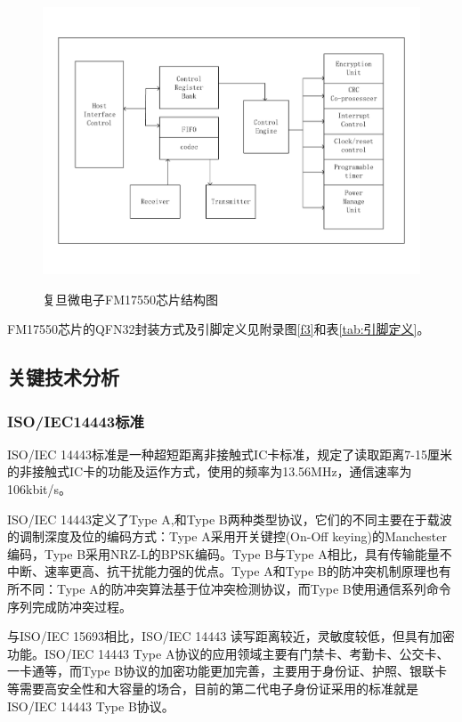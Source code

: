 \documentclass[a4paper]{ctexart}
\begin{document}
\begin{spacing}{1.5}
\begin{figure}
	\includegraphics[width=\textwidth]{figure/RFID2-2.pdf}\\
	\caption{复旦微电子FM17550芯片结构图}\label{f2}
\end{figure}

FM17550芯片的QFN32封装方式及引脚定义见附录图\ref{f3}和表\ref{tab:引脚定义}。
\subsection{关键技术分析}
\subsubsection{ISO/IEC14443标准}
ISO/IEC 14443标准是一种超短距离非接触式IC卡标准，规定了读取距离7-15厘米的非接触式IC卡的功能及运作方式，使用的频率为13.56MHz，通信速率为106kbit/s。

ISO/IEC 14443定义了Type A,和Type B两种类型协议，它们的不同主要在于载波的调制深度及位的编码方式：Type A采用开关键控(On-Off keying)的Manchester编码，Type B采用NRZ-L的BPSK编码。Type B与Type A相比，具有传输能量不中断、速率更高、抗干扰能力强的优点。Type A和Type B的防冲突机制原理也有所不同：Type A的防冲突算法基于位冲突检测协议，而Type B使用通信系列命令序列完成防冲突过程。

与ISO/IEC 15693相比，ISO/IEC 14443 读写距离较近，灵敏度较低，但具有加密功能。ISO/IEC 14443 Type A协议的应用领域主要有门禁卡、考勤卡、公交卡、一卡通等，而Type B协议的加密功能更加完善，主要用于身份证、护照、银联卡等需要高安全性和大容量的场合，目前的第二代电子身份证采用的标准就是ISO/IEC 14443 Type B协议。



\newpage
{}
\begin{appendices}

\end{appendices}
\end{spacing}
\end{document}
